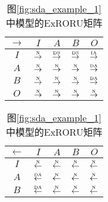 \begin{table}[htbp]
  \centering
  \caption{图\ref{fig:sda_example}中两个模型的ExRORU矩阵}
  \label{tab:sda_example_matrix}
  \begin{subtable}{1\textwidth}
    \centering
    \caption{图\ref{fig:sda_example_1}中模型的ExRORU矩阵}
    \label{tab:sda_example_1_matrix}
    \begin{minipage}[b]{0.3\textwidth}
      \centering
      \begin{tabular}{|c|c|c|c|c|} \hline
        $\rightarrow$ & $I$ & $A$ & $B$ & $O$\\ \hline
        $I$ & $\overset{\text{\tiny{N}}}{\rightarrow}$ & $\overset{\text{\tiny{DS}}}{\rightarrow}$ & $\overset{\text{\tiny{DS}}}{\rightarrow}$ & \cellcolor{lightgray}$\overset{\text{\tiny{IA}}}{\rightarrow}$\\ \hline
        $A$ & $\overset{\text{\tiny{N}}}{\rightarrow}$ & $\overset{\text{\tiny{N}}}{\rightarrow}$ & $\overset{\text{\tiny{N}}}{\rightarrow}$ & $\overset{\text{\tiny{DA}}}{\rightarrow}$\\ \hline
        $B$ & $\overset{\text{\tiny{N}}}{\rightarrow}$ & $\overset{\text{\tiny{N}}}{\rightarrow}$ & $\overset{\text{\tiny{N}}}{\rightarrow}$ & $\overset{\text{\tiny{DA}}}{\rightarrow}$\\ \hline
        $O$ & $\overset{\text{\tiny{N}}}{\rightarrow}$ & $\overset{\text{\tiny{N}}}{\rightarrow}$ & $\overset{\text{\tiny{N}}}{\rightarrow}$ & $\overset{\text{\tiny{N}}}{\rightarrow}$\\ \hline
      \end{tabular}
    \end{minipage}
    \begin{minipage}[b]{0.3\textwidth}
      \centering
      \begin{tabular}{|c|c|c|c|c|} \hline
        $\leftarrow$ & $I$ & $A$ & $B$ & $O$\\ \hline
        $I$ & $\overset{\text{\tiny{N}}}{\leftarrow}$ & $\overset{\text{\tiny{N}}}{\leftarrow}$ & $\overset{\text{\tiny{N}}}{\leftarrow}$ & $\overset{\text{\tiny{N}}}{\leftarrow}$\\ \hline
        $A$ & $\overset{\text{\tiny{DA}}}{\leftarrow}$ & $\overset{\text{\tiny{N}}}{\leftarrow}$ & $\overset{\text{\tiny{N}}}{\leftarrow}$ & $\overset{\text{\tiny{N}}}{\leftarrow}$\\ \hline
        $B$ & $\overset{\text{\tiny{DA}}}{\leftarrow}$ & $\overset{\text{\tiny{N}}}{\leftarrow}$ & $\overset{\text{\tiny{N}}}{\leftarrow}$ & $\overset{\text{\tiny{N}}}{\leftarrow}$\\ \hline

\end{tabular}
\end{minipage}
\end{subtable}
\end{table}
